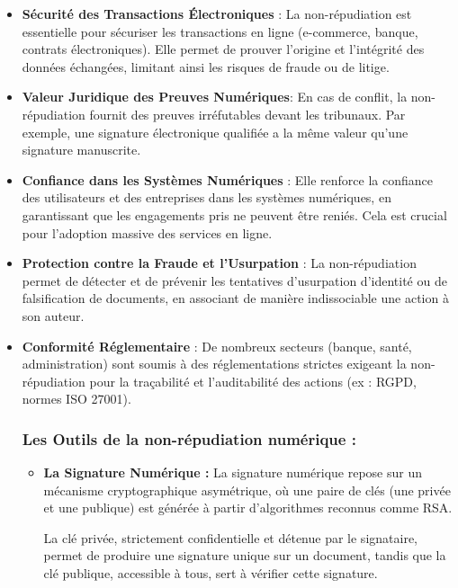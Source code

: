 \documentclass[11pt]{article}
\begin{document}
\begin{itemize}
    \item\textbf{Sécurité des Transactions Électroniques} : La non-répudiation est essentielle pour sécuriser les transactions en ligne (e-commerce, banque, contrats électroniques). Elle permet de prouver l’origine et l’intégrité des données échangées, limitant ainsi les risques de fraude ou de litige.

    \item \textbf{ Valeur Juridique des Preuves Numériques}: En cas de conflit, la non-répudiation fournit des preuves irréfutables devant les tribunaux. Par exemple, une signature électronique qualifiée a la même valeur qu'une signature manuscrite.

    \item \textbf{Confiance dans les Systèmes Numériques} : Elle renforce la confiance des utilisateurs et des entreprises dans les systèmes numériques, en garantissant que les engagements pris ne peuvent être reniés. Cela est crucial pour l’adoption massive des services en ligne.

    \item \textbf{ Protection contre la Fraude et l’Usurpation} : La non-répudiation permet de détecter et de prévenir les tentatives d’usurpation d’identité ou de falsification de documents, en associant de manière indissociable une action à son auteur.

    \item \textbf{Conformité Réglementaire} : De nombreux secteurs (banque, santé, administration) sont soumis à des réglementations strictes exigeant la non-répudiation pour la traçabilité et l’auditabilité des actions (ex : RGPD, normes ISO 27001).

    \subsubsection{Les Outils de la non-répudiation numérique : }

    \begin{itemize}
        \item \textbf{La Signature Numérique :}
        La signature numérique repose sur un mécanisme cryptographique asymétrique, où une paire de clés (une privée et une publique) est générée à partir d’algorithmes reconnus comme RSA.

        La clé privée, strictement confidentielle et détenue par le signataire, permet de produire une signature unique sur un document, tandis que la clé publique, accessible à tous, sert à vérifier cette signature. 


\end{itemize}
\end{itemize}
\end{document}
